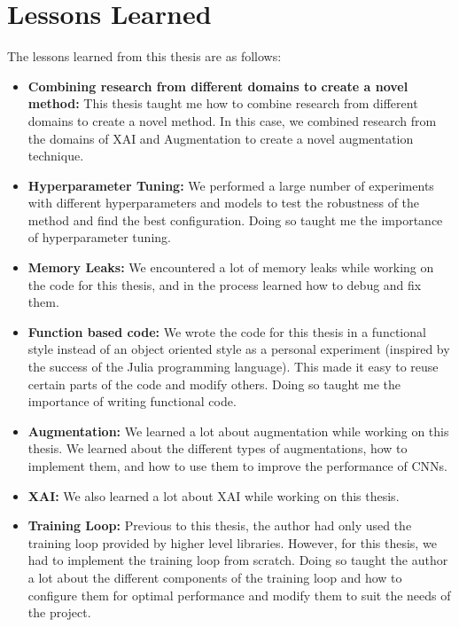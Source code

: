 \section{Lessons Learned}
The lessons learned from this thesis are as follows:
\begin{itemize}
    \item \textbf{Combining research from different domains to create a novel method: } This thesis taught me how to combine research from different domains to create a novel method. In this case, we combined research from the domains of XAI and Augmentation to create a novel augmentation technique.
    \item \textbf{Hyperparameter Tuning: } We performed a large number of experiments with different hyperparameters and models to test the robustness of the method and find the best configuration. Doing so taught me the importance of hyperparameter tuning.
    \item \textbf{Memory Leaks: }We encountered a lot of memory leaks while working on the code for this thesis, and in the process learned how to debug and fix them. 
    \item \textbf{Function based code: }We wrote the code for this thesis in a functional style instead of an object oriented style as a personal experiment (inspired by the success of the Julia programming language). This made it easy to reuse certain parts of the code and modify others. Doing so taught me the importance of writing functional code.
    \item \textbf{Augmentation: }We learned a lot about augmentation while working on this thesis. We learned about the different types of augmentations, how to implement them, and how to use them to improve the performance of CNNs.
    \item \textbf{XAI: }We also learned a lot about XAI while working on this thesis. 
    \item \textbf{Training Loop: } Previous to this thesis, the author had only used the training loop provided by higher level libraries. However, for this thesis, we had to implement the training loop from scratch. Doing so taught the author a lot about the different components of the training loop and how to configure them for optimal performance and modify them to suit the needs of the project.
\end{itemize}

